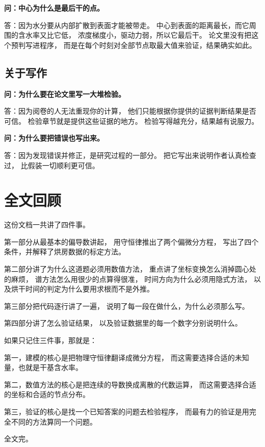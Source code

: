 \textbf{问：中心为什么是最后干的点。}

答：因为水分要从内部扩散到表面才能被带走。
中心到表面的距离最长，而它周围的含水率又比它低，
浓度梯度小，驱动力弱，所以它最后干。
论文里没有把这个预判写进程序，
而是在每个时刻对全部节点取最大值来验证，结果确实如此。

\subsection{关于写作}

\textbf{问：为什么要在论文里写一大堆检验。}

答：因为阅卷的人无法重现你的计算，
他们只能根据你提供的证据判断结果是否可信。
检验章节就是提供这些证据的地方。
检验写得越充分，结果越有说服力。

\textbf{问：为什么要把错误也写出来。}

答：因为发现错误并修正，是研究过程的一部分。
把它写出来说明作者认真检查过，
比假装一切顺利更可信。

\section{全文回顾}

这份文档一共讲了四件事。

第一部分从最基本的偏导数讲起，
用守恒律推出了两个偏微分方程，
写出了四个条件，并解释了烘房数据的标定方法。

第二部分讲了为什么这道题必须用数值方法，
重点讲了坐标变换怎么消掉圆心处的麻烦，
谱方法怎么用很少的点算得很准，
时间方向为什么必须用隐式方法，
以及烘干时间的判定为什么要用求根而不是外推。

第三部分把代码逐行讲了一遍，
说明了每一段在做什么，为什么必须那么写。

第四部分讲了怎么验证结果，
以及验证数据里的每一个数字分别说明什么。

如果只记住三件事，那就是：

第一，建模的核心是把物理守恒律翻译成微分方程，
而这需要选择合适的未知量，也就是干基含水率。

第二，数值方法的核心是把连续的导数换成离散的代数运算，
而这需要选择合适的坐标和合适的节点分布。

第三，验证的核心是找一个已知答案的问题去检验程序，
而最有力的验证是用完全不同的方法算同一个问题。

\vspace{1em}
\noindent
全文完。
